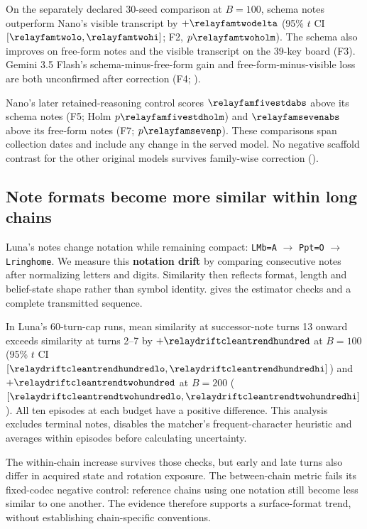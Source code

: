 On the separately declared 30-seed comparison at $B{=}100$, schema notes outperform Nano's visible transcript by $+\relayfamtwodelta$ (95\% $t$ CI $[\relayfamtwolo,\relayfamtwohi]$; F2, $p\relayfamtwoholm$). The schema also improves on free-form notes and the visible transcript on the 39-key board (F3). Gemini 3.5 Flash's schema-minus-free-form gain and free-form-minus-visible loss are both unconfirmed after correction (F4; ).

Nano's later retained-reasoning control scores $\relayfamfivestdabs$ above its schema notes (F5; Holm $p\relayfamfivestdholm$) and $\relayfamsevenabs$ above its free-form notes (F7; $p\relayfamsevenp$). These comparisons span collection dates and include any change in the served model. No negative scaffold contrast for the other original models survives family-wise correction ().

\FloatBarrier

\subsection{Note formats become more similar within long chains}\label{sec:convention}
Luna's notes change notation while remaining compact: \texttt{LMb=A} $\to$ \texttt{Ppt=O} $\to$ \texttt{Lringhome}. We measure this \textbf{notation drift} by comparing consecutive notes after normalizing letters and digits. Similarity then reflects format, length and belief-state shape rather than symbol identity.  gives the estimator checks and a complete transmitted sequence.

In Luna's 60-turn-cap runs, mean similarity at successor-note turns 13 onward exceeds similarity at turns 2--7 by $+\relaydriftcleantrendhundred$ at $B{=}100$ (95\% $t$ CI $[\relaydriftcleantrendhundredlo,\relaydriftcleantrendhundredhi]$) and $+\relaydriftcleantrendtwohundred$ at $B{=}200$ ($[\relaydriftcleantrendtwohundredlo,\relaydriftcleantrendtwohundredhi]$). All ten episodes at each budget have a positive difference. This analysis excludes terminal notes, disables the matcher's frequent-character heuristic and averages within episodes before calculating uncertainty.

The within-chain increase survives those checks, but early and late turns also differ in acquired state and rotation exposure. The between-chain metric fails its fixed-codec negative control: reference chains using one notation still become less similar to one another. The evidence therefore supports a surface-format trend, without establishing chain-specific conventions.
